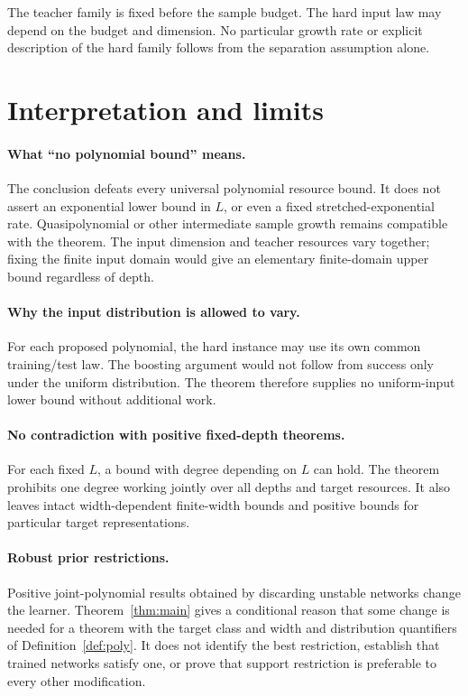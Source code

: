 \documentclass[11pt]{article}
\theoremstyle{remark}\newtheorem{remark}[theorem]{Remark}
\begin{document}
The teacher family is fixed before the sample budget. The hard input
law may depend on the budget and dimension. No particular growth rate
or explicit description of the hard family follows from the separation
assumption alone.

\section{Interpretation and limits}

\paragraph{What ``no polynomial bound'' means.}
The conclusion defeats every universal polynomial resource bound. It
does not assert an exponential lower bound in $L$, or even a fixed
stretched-exponential rate. Quasipolynomial or other intermediate sample
growth remains compatible with the theorem. The input dimension and
teacher resources vary together; fixing the finite input domain would
give an elementary finite-domain upper bound regardless of depth.

\paragraph{Why the input distribution is allowed to vary.}
For each proposed polynomial, the hard instance may use its own common
training/test law. The boosting argument would not follow from success
only under the uniform distribution. The theorem therefore supplies no
uniform-input lower bound without additional work.

\paragraph{No contradiction with positive fixed-depth theorems.}
For each fixed $L$, a bound with degree depending on $L$ can hold.
The theorem prohibits one degree working jointly over all depths and
target resources. It also leaves intact width-dependent finite-width
bounds and positive bounds for particular target representations.

\paragraph{Robust prior restrictions.}
Positive joint-polynomial results obtained by discarding unstable
networks change the learner. Theorem~\ref{thm:main} gives a conditional
reason that some change is needed for a theorem with the target class and
width and distribution quantifiers of Definition~\ref{def:poly}. It does not identify the best
restriction, establish that trained networks satisfy one, or prove that
support restriction is preferable to every other modification.
\end{document}
